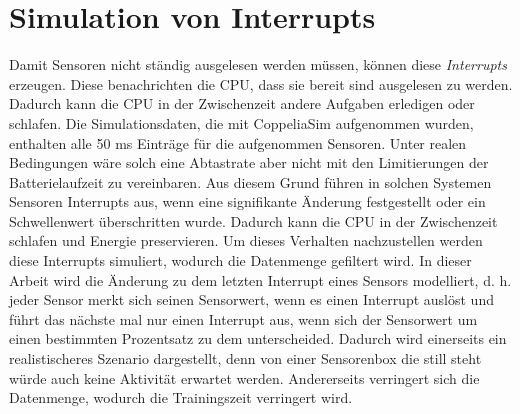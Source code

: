\section{Simulation von Interrupts}
Damit Sensoren nicht ständig ausgelesen werden müssen, können diese \textit{Interrupts} erzeugen.
Diese benachrichten die CPU, dass sie bereit sind ausgelesen zu werden.
Dadurch kann die CPU in der Zwischenzeit andere Aufgaben erledigen oder schlafen.
\newline
\newline
Die Simulationsdaten, die mit CoppeliaSim aufgenommen wurden, enthalten alle 50 ms Einträge für die aufgenommen Sensoren.
Unter realen Bedingungen wäre solch eine Abtastrate aber nicht mit den Limitierungen der Batterielaufzeit zu vereinbaren.
Aus diesem Grund führen in solchen Systemen Sensoren Interrupts aus, wenn eine signifikante Änderung festgestellt oder ein Schwellenwert überschritten wurde.
Dadurch kann die CPU in der Zwischenzeit schlafen und Energie preservieren.
\newline
\newline
Um dieses Verhalten nachzustellen werden diese Interrupts simuliert, wodurch die Datenmenge gefiltert wird.
In dieser Arbeit wird die Änderung zu dem letzten Interrupt eines Sensors modelliert,
d. h. jeder Sensor merkt sich seinen Sensorwert, wenn es einen Interrupt auslöst
und führt das nächste mal nur einen Interrupt aus, wenn sich der Sensorwert um einen bestimmten Prozentsatz zu dem unterscheided.
Dadurch wird einerseits ein realistischeres Szenario dargestellt,
denn von einer Sensorenbox die still steht würde auch keine Aktivität erwartet werden.
Andererseits verringert sich die Datenmenge, wodurch die Trainingszeit verringert wird.

\iffalse
\newline
\newline
Allerdings hat sich gezeigt, dass manche Standorte deutlich unterrepräsentiert sind in der Trainingsmenge.
Aus diesem Grund wurde zusätzlich für die Trainingsmenge eine Mindestabtastrate von 4 Hertz eingeführt,
falls in diesem Zeitraum kein Interrupt für diesen Standort stattgefunden hat.
\fi